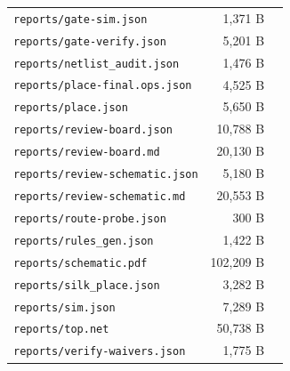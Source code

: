 \documentclass[11pt,a4paper]{article}
\begin{document}
{\begin{longtable}{p{9cm}rp{4cm}}
\texttt{reports/gate-sim.json} & 1,371 B &  \\
\texttt{reports/gate-verify.json} & 5,201 B &  \\
\texttt{reports/netlist\_audit.json} & 1,476 B &  \\
\texttt{reports/place-final.ops.json} & 4,525 B &  \\
\texttt{reports/place.json} & 5,650 B &  \\
\texttt{reports/review-board.json} & 10,788 B &  \\
\texttt{reports/review-board.md} & 20,130 B &  \\
\texttt{reports/review-schematic.json} & 5,180 B &  \\
\texttt{reports/review-schematic.md} & 20,553 B &  \\
\texttt{reports/route-probe.json} & 300 B &  \\
\texttt{reports/rules\_gen.json} & 1,422 B &  \\
\texttt{reports/schematic.pdf} & 102,209 B &  \\
\texttt{reports/silk\_place.json} & 3,282 B &  \\
\texttt{reports/sim.json} & 7,289 B &  \\
\texttt{reports/top.net} & 50,738 B &  \\
\texttt{reports/verify-waivers.json} & 1,775 B &  \\
\bottomrule
\end{longtable}
}
\end{document}
